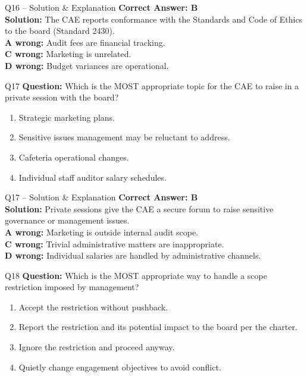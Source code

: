 \documentclass[aspectratio=169,10pt]{beamer}
\begin{document}
	\begin{frame}[t]{Q16 -- Solution \& Explanation}
		\small
		\textbf{Correct Answer: B} \\[4pt]
		\textbf{Solution:} The CAE reports conformance with the Standards and Code of Ethics to the board (Standard 2430). \\[4pt]
		\textbf{A wrong:} Audit fees are financial tracking. \\[2pt]
		\textbf{C wrong:} Marketing is unrelated. \\[2pt]
		\textbf{D wrong:} Budget variances are operational.
	\end{frame}
	
	\begin{frame}[t]{Q17}
		\small
		\textbf{Question:} Which is the MOST appropriate topic for the CAE to raise in a private session with the board?
		\begin{enumerate}[label=\Alph*.,itemsep=1pt,topsep=2pt]
			\item Strategic marketing plans.
			\item Sensitive issues management may be reluctant to address.
			\item Cafeteria operational changes.
			\item Individual staff auditor salary schedules.
		\end{enumerate}
	\end{frame}
	
	\begin{frame}[t]{Q17 -- Solution \& Explanation}
		\small
		\textbf{Correct Answer: B} \\[4pt]
		\textbf{Solution:} Private sessions give the CAE a secure forum to raise sensitive governance or management issues. \\[4pt]
		\textbf{A wrong:} Marketing is outside internal audit scope. \\[2pt]
		\textbf{C wrong:} Trivial administrative matters are inappropriate. \\[2pt]
		\textbf{D wrong:} Individual salaries are handled by administrative channels.
	\end{frame}
	
	\begin{frame}[t]{Q18}
		\small
		\textbf{Question:} Which is the MOST appropriate way to handle a scope restriction imposed by management?
		\begin{enumerate}[label=\Alph*.,itemsep=1pt,topsep=2pt]
			\item Accept the restriction without pushback.
			\item Report the restriction and its potential impact to the board per the charter.
			\item Ignore the restriction and proceed anyway.
			\item Quietly change engagement objectives to avoid conflict.
		\end{enumerate}
	\end{frame}
	
\end{document}
